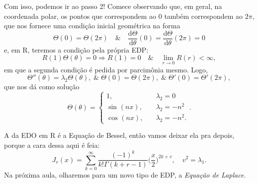 \documentclass[../pde_notes.tex]{subfiles}
\begin{document}
Com isso, podemos ir ao passo 2! Comece observando que, em geral, na coordenada polar, os pontos que correspondem ao 0 também correspondem ao \(2\pi \), que nos fornece uma condição inicial geométrica na forma
\[
	\Theta(0) = \Theta (2\pi ) \quad\&\quad \frac{\mathrm{d}\Theta}{\mathrm{d}\theta }(0) = \frac{\mathrm{d}\Theta}{\mathrm{d}\theta }(2\pi ) = 0
\]
e, em R, teremos a condição pela própria EDP:
\[
	R(1)\Theta (\theta ) = 0 \Rightarrow R(1) = 0 \quad\&\quad \lim_{r\to 0}R(r) < \infty,
\]
em que a segunda condição é pedida por parcimônia mesmo. Logo,
\[
	\Theta''(\theta ) = \lambda_{2}\Theta(\theta ),\;\&\;\Theta(0) =\Theta(2\pi ),\;\&\;\Theta'(0) =\Theta'(2\pi ),
\]
que nos dá como solução
\[
	\Theta(\theta ) = \left\{\begin{array}{ll}
		1,             & \quad \lambda_2 = 0       \\
		\sin^{}{(nx)}, & \quad \lambda_2 = -n^{2}  \\
		\cos^{}{(nx)}, & \quad \lambda_2 = -n^{2}.
	\end{array}\right..
\]

A da EDO em R é a Equação de Bessel, então vamos deixar ela pra depois, porque a cara dessa aqui é feia:
\[
	J_{v}(x) = \sum\limits_{k=0}^{\infty}\frac{(-1)^{k}}{k!\Gamma (k+r-1)}\biggl(\frac{x}{2}\biggr)^{2k+v},\quad v^{2} = \lambda_{1}.
\]
Na próxima aula, olharemos para um novo tipo de EDP, a \textit{Equação de Laplace}.
\end{document}
